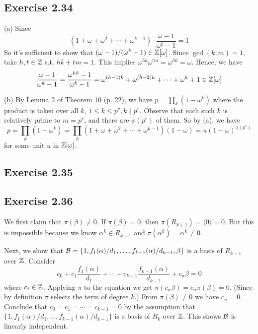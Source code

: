 \documentclass[../Marcus.tex]{subfiles}
\begin{document}
\subsection*{Exercise 2.34}

(a) Since $$\left(1+\omega+\omega^2+\cdots+\omega^{k-1}\right)\cdot\frac{\omega-1}{\omega^k-1}=1$$ So it's sufficient to show that $(\omega-1)/(\omega^k-1)\in\mathbb{Z}[\omega]$. Since $\gcd(k,m)=1$, take $h,t\in\mathbb{Z}$ s.t. $hk+tm=1$. This implies $\omega^{hk}\omega^{tm}=\omega^{hk}=\omega$. Hence, we have $$\frac{\omega-1}{\omega^k-1}=\frac{\omega^{hk}-1}{\omega^k-1}=\omega^{(h-1)k}+\omega^{(h-2)k}+\cdots+\omega^k+1\in\mathbb{Z}[\omega]$$

(b) By Lemma 2 of Theorem 10 (p. 22), we have $p=\prod_{k} (1-\omega^k)$ where the product is taken over all $k$, $1\leq k\leq p^r,k\nmid p^r$. Observe that each such $k$ is relatively prime to $m=p^r$, and there are $\phi(p^r)$ of them. So by (a), we have $$p=\prod_{k} (1-\omega^k)= \prod_{k}(1+\omega+\omega^2+\cdots+\omega^{k-1})(1-\omega)=u(1-\omega)^{\phi(p^r)}
$$
for some unit $u$ in $\mathbb{Z}[\omega]$.

\subsection*{Exercise 2.35}

\subsection*{Exercise 2.36}

We first claim that $\pi(\beta)\neq 0$. If $\pi(\beta)=0$, then $\pi(R_{k+1})=\langle0\rangle=0$. But this is impossible because we know $\alpha^k\in R_{k+1}$ and $\pi(\alpha^k)=\alpha^k\neq0$.

Next, we show that $\mathcal{B}=\{1,f_1(\alpha)/d_1,\ldots,f_{k-1}(\alpha)/d_{k-1},\beta\}$ is a basis of $R_{k+1}$ over $\mathbb{Z}$. Consider $$c_0+c_1\frac{f_1(\alpha)}{d_1}+\cdots+c_{k-1}\frac{f_{k-1}(\alpha)}{d_{k-1}}+c_n\beta=0$$ where $c_i\in\mathbb{Z}$. Applying $\pi$ to the equation we get $\pi(c_n\beta)=c_n\pi(\beta)=0$. (Since by definition $\pi$ selects the term of degree $k$.) From $\pi(\beta)\neq 0$ we have $c_n=0$. Conclude that $c_0=c_1=\cdots=c_{k-1}=0$ by the assumption that $\{1,f_1(\alpha)/d_1,\ldots,f_{k-1}(\alpha)/d_{k-1}\}$ is a basis of $R_k$ over $\mathbb{Z}$. This shows $\mathcal{B}$ is linearly independent.
\end{document}
